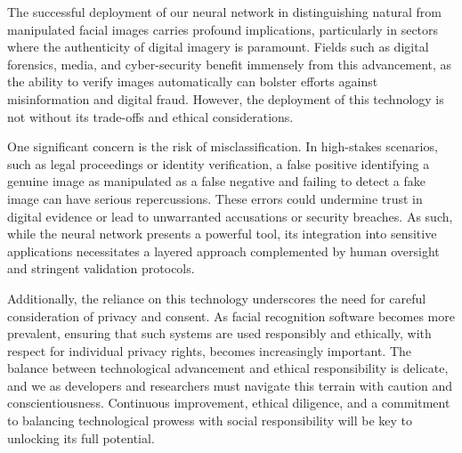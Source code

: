 \documentclass{article}
\begin{document}
\begin{titlepage}
\begin{itemize}
The successful deployment of our neural network in distinguishing natural from manipulated facial images carries profound implications, particularly in sectors where the authenticity of digital imagery is paramount. Fields such as digital forensics, media, and cyber-security benefit immensely from this advancement, as the ability to verify images automatically can bolster efforts against misinformation and digital fraud. However, the deployment of this technology is not without its trade-offs and ethical considerations.


One significant concern is the risk of misclassification. In high-stakes scenarios, such as legal proceedings or identity verification, a false positive identifying a genuine image as manipulated as a false negative and failing to detect a fake image can have serious repercussions. These errors could undermine trust in digital evidence or lead to unwarranted accusations or security breaches. As such, while the neural network presents a powerful tool, its integration into sensitive applications necessitates a layered approach complemented by human oversight and stringent validation protocols.


Additionally, the reliance on this technology underscores the need for careful consideration of privacy and consent. As facial recognition software becomes more prevalent, ensuring that such systems are used responsibly and ethically, with respect for individual privacy rights, becomes increasingly important. The balance between technological advancement and ethical responsibility is delicate, and we as developers and researchers must navigate this terrain with caution and conscientiousness.
Continuous improvement, ethical diligence, and a commitment to balancing technological prowess with social responsibility will be key to unlocking its full potential.
        \end{itemize}

	\pagebreak

\end{titlepage}
\end{document}
